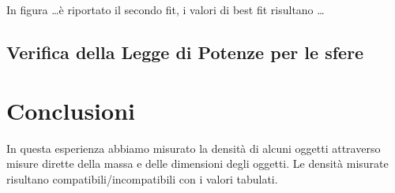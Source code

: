 \documentclass{article}
\begin{document}
In figura \ldots  \`e riportato il secondo fit, i valori di best fit risultano \ldots

\subsection{Verifica della Legge di Potenze per le sfere}


\section{Conclusioni}
In questa esperienza abbiamo misurato la densit\`a di alcuni oggetti attraverso misure dirette della massa e delle dimensioni degli oggetti. Le densit\`a misurate risultano compatibili/incompatibili con i valori tabulati.
\end{document}
